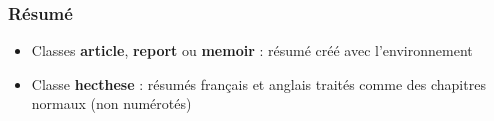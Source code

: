 \begin{frame}[c,fragile]

	\frametitle{Résumé}
	
	\begin{itemize}
		\item Classes \textbf{article}, \textbf{report} ou \textbf{memoir} : résumé créé avec l’environnement
		
		\begin{codesource}
	\begin{abstract}
		...
	\end{abstract}
		\end{codesource}
	
		\item Classe \textbf{hecthese} : résumés français et anglais traités comme des chapitres normaux (non numérotés)
	\end{itemize}
\end{frame}


